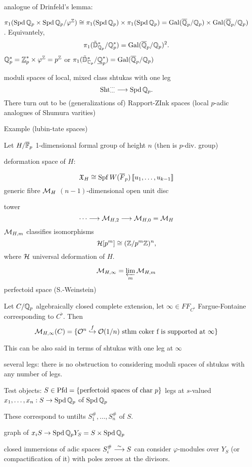analogue of Drinfeld's lemma:

\begin{thm}
$\pi_1(\operatorname{Spd} \mathbb{Q}_p \times \operatorname{Spd} \mathbb{Q}_p/\varphi^{\mathbb{Z}}) \cong \pi_1(\operatorname{Spd} \mathbb{Q}_p) \times \pi_1(\operatorname{Spd} \mathbb{Q}_p) = \operatorname{Gal}(\overline{\mathbb{Q}}_p/\mathbb{Q}_p) \times \operatorname{Gal}(\overline{\mathbb{Q}}_p/\mathbb{Q}_p)$. Equivantely, 
	\[
	\pi_1(\tilde{\mathbb{D}}_{\mathbb{Q}_p}^*/\mathbb{Q}_p^*)= \operatorname{Gal}(\overline{\mathbb{Q}}_p/\mathbb{Q}_p)^2.
	\]
$\mathbb{Q}_p^*= \underline{\mathbb{Z}}_p^* \times \varphi^{\mathbb{Z}}= p^{\mathbb{Z}}$
or $\pi_1(\tilde{\mathbb{D}}_{\mathbb{C}_p}^*/ \underline{\mathbb{Q}}_p^*)= \operatorname{Gal}(\overline{\mathbb{Q}}_p/\mathbb{Q}_p)$
\end{thm}

moduli spaces of local, mixed class shtukas with one leg
	\[
	\operatorname{Sht}_{\cdots}^{\cdots} \stackrel{}{\longrightarrow} \operatorname{Spd} \mathbb{Q}_p.
	\]
There turn out to be (generalizations of) Rapport-ZInk spaces (local $p$-adic analogues of Shumura varities)


Example (lubin-tate spaces)

Let $H/\overline{\mathbb{F}}_p$ 1-dimensional formal group of height $n$ (then is $p$-div. group)

deformation space of $H$:

	\[
	\mathfrak{X}_H \cong \operatorname{Spf} W(\overline{F}_p) \left\llbracket u_1,\ldots,u_{k-1} \right\rrbracket
	\]
generic fibre $\mathcal{M}_H$ $(n-1)$-dimensional open unit disc

tower
	\[
	\cdots \stackrel{}{\longrightarrow} \mathcal{M}_{H,2} \stackrel{}{\longrightarrow} \mathcal{M}_{H,0}= \mathcal{M}_H
	\]
$\mathcal{M}_{H,m}$ classifies isomorphisms
	\[
	\mathcal{H}[p^m] \cong (\mathbb{Z}/p^m\mathbb{Z})^n,
	\]
where $\mathcal{H}$ universal deformation of $H$.

	\[
	\mathcal{M}_{H,\infty}= \varprojlim_m \mathcal{M}_{H,m}
	\]
perfectoid space (S.-Weinstein)

\begin{thm}[S., Weinstein]
Let $C/\mathbb{Q}_p$ algebraically closed complete extension, let $\infty \in FF_{C^\flat}$ Fargue-Fontaine corresponding to $C^\flat$. Then
	\[
	\mathcal{M}_{H,\infty}(C)= \{ \mathcal{O}^n \stackrel{f}{\hookrightarrow} \mathcal{O}(1/n) \text{ sthm coker f is supported at }\infty\}
	\]
\end{thm}

This can be also said in terms of shtukas with one leg at $\infty$

several legs: there is no obstruction to considering moduli spaces of shtukas with any number of legs.

Test objects: $S \in \operatorname{Pfd}= \{ \text{perfectoid spaces of char }p\}$
legs at $s$-valued $x_1,\ldots,x_n: S \to \operatorname{Spd} \mathbb{Q}_p$ of $\operatorname{Spd} \mathbb{Q}_p$

These correspond to untilts $S_1^\#,\ldots,S^\#_n$ of $S$.

graph of $x_i S \to \operatorname{Spd} \mathbb{Q}_p Y_S= S \times \operatorname{Spd} \mathbb{Q}_p$

closed immersions of adic spaces
$S_i^\# \stackrel{\sim}{\longrightarrow} S$
can consider $\varphi$-modules over $Y_S$ (or compactification of it) with poles zeroes at the divisors. 

